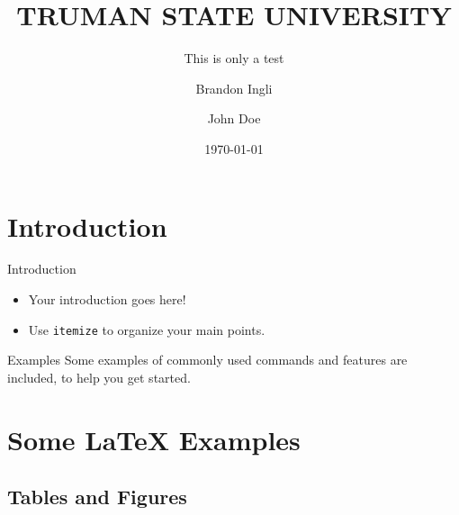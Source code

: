 \documentclass[aspectratio=169, t]{beamer}
\begin{document}
\title[Short Title]{TRUMAN STATE UNIVERSITY}
\subtitle{This is only a test}
\author[Short Author]{Brandon Ingli \and John Doe}
\date[]{\today}

\maketitle

\section{Introduction}

\begin{frame}[label=intro]{Introduction}
\begin{itemize}
  \item Your introduction goes here!
  \item Use \texttt{itemize} to organize your main points.
\end{itemize}

\begin{block}{Examples}
Some examples of commonly used commands and features are included, to help you get started.
\end{block}

\end{frame}

\section{Some \LaTeX{} Examples}

\subsection{Tables and Figures}
\end{document}
